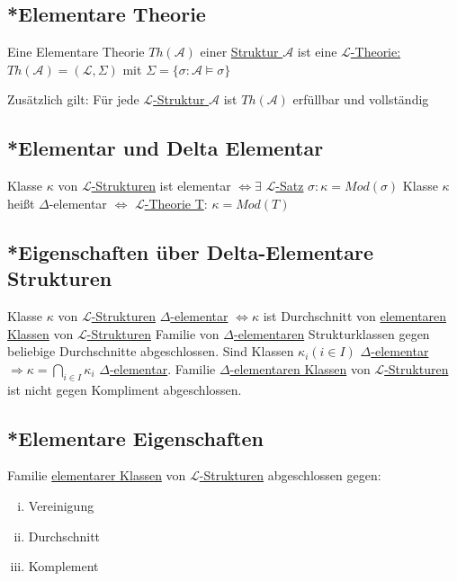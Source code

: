 \documentclass[12pt,a4paper]{article} %
\begin{document}
	\subsection{*Elementare Theorie}
	Eine Elementare Theorie $Th(\mathcal{A})$ einer \hyperref[Struktur]{Struktur $\mathcal{A}$} ist eine \hyperref[Theorie]{$\mathcal{L}$-Theorie: $Th(\mathcal{A}) = (\mathcal{L}, \Sigma)$} mit $\Sigma = \{\sigma : \mathcal{A} \hyperref[Erfullbar]{\vDash} \sigma\}$ 
	
	Zusätzlich gilt: Für jede \hyperref[Struktur]{$\mathcal{L}$-Struktur $\mathcal{A}$} ist $Th(\mathcal{A})$ erfüllbar und vollständig
	
	\subsection{*Elementar und Delta Elementar}
	\label{Elementar}
	Klasse $\kappa$ von \hyperref[Struktur]{$\mathcal{L}$-Strukturen} ist elementar $\Leftrightarrow \exists$ \hyperref[LSatz]{$\mathcal{L}$-Satz} $\sigma: \kappa = Mod(\sigma)$ \newline
	Klasse $\kappa$ heißt $\Delta$-elementar $\Leftrightarrow$ \hyperref[Theorie]{$\mathcal{L}$-Theorie T}: $\kappa = Mod(T)$
	
	\subsection{*Eigenschaften über Delta-Elementare Strukturen}
	Klasse $\kappa$ von \hyperref[Struktur]{$\mathcal{L}$-Strukturen} \hyperref[Elementar]{$\Delta$-elementar} $\Leftrightarrow \kappa$ ist Durchschnitt von \hyperref[Elementar]{elementaren Klassen} von \hyperref[Struktur]{$\mathcal{L}$-Strukturen} \newline{}
	\newline
	Familie von \hyperref[Elementar]{$\Delta$-elementaren} Strukturklassen gegen beliebige Durchschnitte abgeschlossen. Sind Klassen $\kappa_i (i \in I)$ \hyperref[Elementar]{$\Delta$-elementar} $\Rightarrow \kappa = \bigcap\limits_{i \in I} \kappa_i$ \hyperref[Elementar]{$\Delta$-elementar}. Familie \hyperref[Elementar]{$\Delta$-elementaren Klassen} von \hyperref[Struktur]{$\mathcal{L}$-Strukturen} ist nicht gegen Kompliment abgeschlossen.
	
	\subsection{*Elementare Eigenschaften}
	Familie \hyperref[Elementar]{elementarer Klassen} von \hyperref[Struktur]{$\mathcal{L}$-Strukturen} abgeschlossen gegen:
	\begin{enumerate}[(i)]
		\item Vereinigung
		\item Durchschnitt
		\item Komplement
	\end{enumerate}
\end{document}
